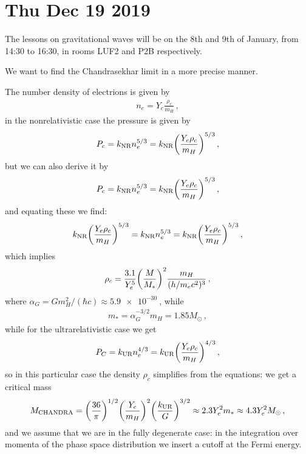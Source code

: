 \documentclass[main.tex]{subfiles}
\begin{document}
\section*{Thu Dec 19 2019}

The lessons on gravitational waves will be on the 8th and 9th of January, from 14:30 to 16:30, in rooms LUF2 and P2B respectively. 

We want to find the Chandrasekhar limit in a more precise manner. 

The number density of electrions is given by 
%
\begin{align}
n_e = Y_{e} \frac{\rho_c}{m_H}
\,,
\end{align}
%
in the nonrelativistic case the pressure is given by 
%
\begin{align}
P_c = k _{\text{NR}} n_e^{5/3} = k _{\text{NR}} \qty(\frac{Y_e \rho_{c}}{m_H})^{5/3}
\,,
\end{align}
%
but we can also derive it by 
%
\begin{align}
P_c = k _{\text{NR}} n_e^{5/3} = k _{\text{NR}} \qty(\frac{Y_e \rho_{c}}{m_H})^{5/3}
\,,
\end{align}
%
and equating these we find: 
%
\begin{align}
 k _{\text{NR}} \qty(\frac{Y_e \rho_{c}}{m_H})^{5/3}
 = k _{\text{NR}} n_e^{5/3} = k _{\text{NR}} \qty(\frac{Y_e \rho_{c}}{m_H})^{5/3}
\,,
\end{align}
%
which implies 
%
\begin{align}
\rho_{c} = \frac{3.1}{Y_e^{5}} \qty(\frac{M}{M_{*}})^2 \frac{m_H}{(h / m_e c^2)^3}
\,,
\end{align}
%
where \(\alpha_{G} = G m_H^2 / (\hbar c) \approx \SI{5.9e-30}{}\), while 
%
\begin{align}
m_{*} = \alpha_{G}^{-3 /2 } m_H = 1.85 M_{\odot}
\,,
\end{align}
%
while for the ultrarelativistic case we get 
%
\begin{align}
P_C = k _{\text{UR}} n_e^{4/3} = k _{\text{UR}} \qty(\frac{Y_e \rho_{c} }{m_H})^{4/3}
\,,
\end{align}
%
so in this particular case the density \(\rho_{c}\) simplifies from the equations: we get a critical mass 
%
\begin{align}
M _{\text{CHANDRA}} = \qty(\frac{36}{\pi })^{1/2} 
\qty(\frac{Y_e}{m_H})^2
\qty(\frac{k _{\text{UR}}}{G})^{3/2} \approx 
2.3 Y_e^2 m_{*} \approx 4.3 Y_e^2 M_{\odot}
\,,
\end{align}
%
and we assume that we are in the fully degenerate case: in the integration over momenta of the phase space distribution we insert a cutoff at the Fermi energy.
\end{document}
